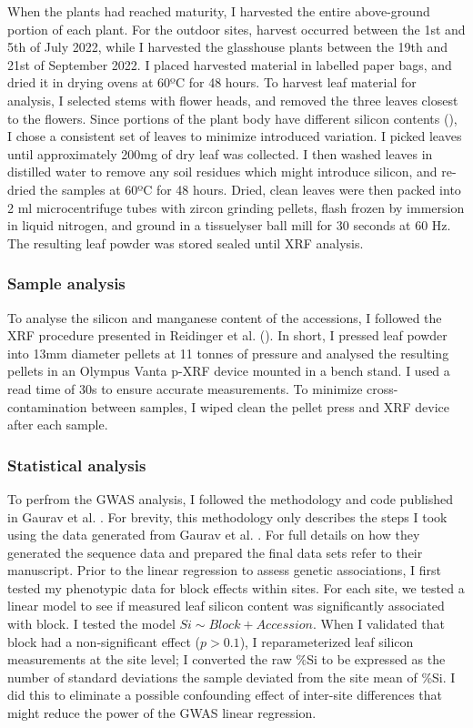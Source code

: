 \documentclass[12pt, letterpaper, ]{article}
\begin{document}
When the plants had reached maturity, I harvested the entire above-ground portion of each plant. For the outdoor sites, harvest occurred between the 1st and 5th of July 2022, while I harvested the glasshouse plants between the 19th and 21st of September 2022. I placed harvested material in labelled paper bags, and dried it in drying ovens at 60ºC for 48 hours. To harvest leaf material for analysis, I selected stems with flower heads, and removed the three leaves closest to the flowers. Since portions of the plant body have different silicon contents (\cite{dai_genetic_2005}), I chose a consistent set of leaves to minimize introduced variation. I picked leaves until approximately 200mg of dry leaf was collected. I then washed leaves in distilled water to remove any soil residues which might introduce silicon, and re-dried the samples at 60ºC for 48 hours. Dried, clean leaves were then packed into 2 ml microcentrifuge tubes with zircon grinding pellets, flash frozen by immersion in liquid nitrogen, and ground in a tissuelyser ball mill for 30 seconds at 60 Hz. The resulting leaf powder was stored sealed until XRF analysis. 

\subsubsection{Sample analysis}

To analyse the silicon and manganese content of the accessions, I followed the XRF procedure presented in Reidinger et al. (). In short, I pressed leaf powder into 13mm diameter pellets at 11 tonnes of pressure and analysed the resulting pellets in an Olympus Vanta p-XRF device mounted in a bench stand. I used a read time of 30s to ensure accurate measurements. To minimize cross-contamination between samples, I wiped clean the pellet press and XRF device after each sample.

\subsubsection{Statistical analysis}

To perfrom the GWAS analysis, I followed the methodology and code published in Gaurav et al. . For brevity, this methodology only describes the steps I took using the data generated from Gaurav et al. . For full details on how they generated the sequence data and prepared the final data sets refer to their manuscript. Prior to the linear regression to assess genetic associations, I first tested my phenotypic data for block effects within sites. For each site, we tested a linear model to see if measured leaf silicon content was significantly associated with block. I tested the model $Si \sim Block + Accession$. When I validated that block had a non-significant effect ($p>0.1$), I reparameterized leaf silicon measurements at the site level; I converted the raw \%Si to be expressed as the number of standard deviations the sample deviated from the site mean of \%Si. I did this to eliminate a possible confounding effect of inter-site differences that might reduce the power of the GWAS linear regression. 
\end{document}
